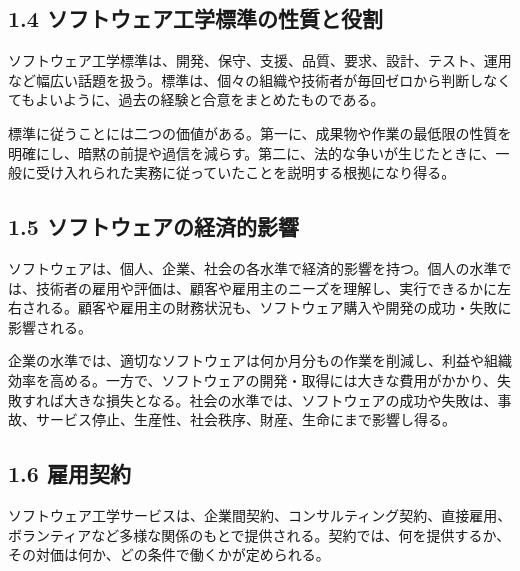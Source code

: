 \documentclass[uplatex,dvipdfmx,a4paper,11pt]{jsarticle}
\begin{document}
\subsection*{1.4 ソフトウェア工学標準の性質と役割}


ソフトウェア工学標準は、開発、保守、支援、品質、要求、設計、テスト、運用など幅広い話題を扱う。標準は、個々の組織や技術者が毎回ゼロから判断しなくてもよいように、過去の経験と合意をまとめたものである。

標準に従うことには二つの価値がある。第一に、成果物や作業の最低限の性質を明確にし、暗黙の前提や過信を減らす。第二に、法的な争いが生じたときに、一般に受け入れられた実務に従っていたことを説明する根拠になり得る。

\begin{center}
\end{center}

\subsection*{1.5 ソフトウェアの経済的影響}


ソフトウェアは、個人、企業、社会の各水準で経済的影響を持つ。個人の水準では、技術者の雇用や評価は、顧客や雇用主のニーズを理解し、実行できるかに左右される。顧客や雇用主の財務状況も、ソフトウェア購入や開発の成功・失敗に影響される。

企業の水準では、適切なソフトウェアは何か月分もの作業を削減し、利益や組織効率を高める。一方で、ソフトウェアの開発・取得には大きな費用がかかり、失敗すれば大きな損失となる。社会の水準では、ソフトウェアの成功や失敗は、事故、サービス停止、生産性、社会秩序、財産、生命にまで影響し得る。

\subsection*{1.6 雇用契約}


ソフトウェア工学サービスは、企業間契約、コンサルティング契約、直接雇用、ボランティアなど多様な関係のもとで提供される。契約では、何を提供するか、その対価は何か、どの条件で働くかが定められる。
\end{document}
